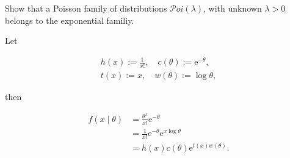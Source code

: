 
\begin{exercise}

Show that a Poisson family of distributions $\mathcal Poi(\lambda)$, with unknown $\lambda > 0$ belongs to the exponential familiy.

\end{exercise}


\begin{solution}

Let

\begin{gather*}
    h(x) := \frac{1}{x!},
    \quad
    c(\theta) := \mathrm e^{-\theta}, \\
    t(x) := x,
    \quad
    w(\theta) := \log \theta,
\end{gather*}

then

\begin{align*}
    f(x \mid \theta)
    & =
    \frac{\theta^x}{x!} \mathrm e^{-\theta} \\
    & =
    \frac{1}{x!} \mathrm e^{-\theta} \mathrm e^{x \log \theta} \\
    & =
    h(x) c(\theta) \mathrm e^{t(x) w(\theta)}.
\end{align*}

\end{solution}

